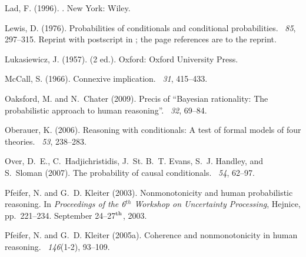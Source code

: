 \documentclass[11pt]{article}
\begin{document}
\begin{thebibliography}{}
Lad, F. (1996).
.
\newblock New York: Wiley.

Lewis, D. (1976).
\newblock Probabilities of conditionals and conditional probabilities.
~{\em 85}, 297--315.
\newblock Reprint with postscript in \cite[76--101]{jackson91}; the page
  references are to the reprint.

Lukasiewicz, J. (1957).
 (2 ed.).
\newblock Oxford: Oxford University Press.

Mc{C}all, S. (1966).
\newblock Connexive implication.
~{\em 31}, 415--433.

Oaksford, M. and N.~Chater (2009).
\newblock Precis of ``{B}ayesian rationality: {T}he probabilistic approach to
  human reasoning''.
~{\em 32}, 69--84.

Oberauer, K. (2006).
\newblock Reasoning with conditionals: {A} test of formal models of four
  theories.
~{\em 53}, 238--283.

Over, D.~E., C.~Hadjichristidis, J.~{\relax St}. B.~T. Evans, S.~J. Handley,
  and S.~Sloman (2007).
\newblock The probability of causal conditionals.
~{\em 54}, 62--97.

Pfeifer, N. and G.~D. Kleiter (2003).
\newblock Nonmonotonicity and human probabilistic reasoning.
\newblock In {\em Proceedings of the 6$^{th}$ Workshop on Uncertainty
  Processing}, Hejnice, pp.\  221--234. September 24--27$^{\textnormal{th}}$,
  2003.

Pfeifer, N. and G.~D. Kleiter (2005a).
\newblock Coherence and nonmonotonicity in human reasoning.
~{\em 146\/}(1-2), 93--109.


\end{thebibliography}
\end{document}
